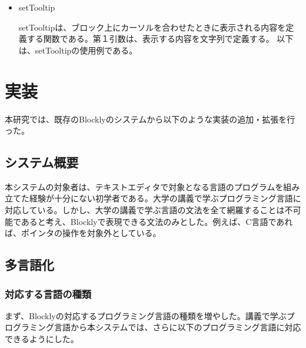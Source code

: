 \documentclass{risepaper}
\begin{document}
\begin{itemize}

\item setTooltip

setTooltipは、ブロック上にカーソルを合わせたときに表示される内容を定義する関数である。第１引数は、表示する内容を文字列で定義する。
以下は、setTooltipの使用例である。


\end{itemize} 

   \chapter{実装}
   
本研究では、既存のBlocklyのシステムから以下のような実装の追加・拡張を行った。
    
   \section{システム概要}

本システムの対象者は、テキストエディタで対象となる言語のプログラムを組み立てた経験が十分にない初学者である。大学の講義で学ぶプログラミング言語に対応している。しかし、大学の講義で学ぶ言語の文法を全て網羅することは不可能であると考え、Blocklyで表現できる文法のみとした。例えば、C言語であれば、ポインタの操作を対象外としている。

   \section{多言語化}
   
   \subsection{対応する言語の種類}
   
まず、Blocklyの対応するプログラミング言語の種類を増やした。講義で学ぶプログラミング言語から本システムでは、さらに以下のプログラミング言語に対応できるようにした。
\end{document}

